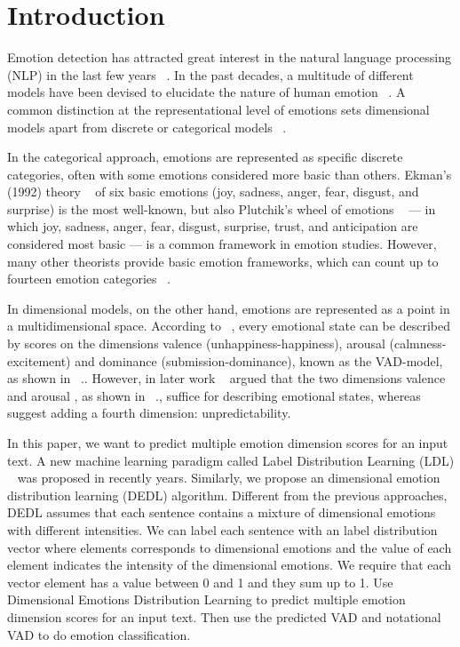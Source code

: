 \section{Introduction}\label{sec-intro}


Emotion detection has attracted great interest 
in the natural language processing (NLP)
in the last few years 
~\citep{DBLP:journals/corr/abs-1804-06137,DBLP:journals/corr/abs-1904-00132}.
In the past decades, 
a multitude of different
models have been devised to 
elucidate the nature of human emotion 
~\citep{Scherer2000}. 
A common distinction at the representational level 
of emotions sets dimensional models apart
from discrete or categorical models 
~\cite{Stevenson2007}.

In the categorical approach, 
emotions are represented as 
specific discrete categories,
often with some emotions considered 
more basic than others. 
Ekman’s (1992) theory 
~\cite{Ekman1992}
of six basic emotions 
(joy, sadness, anger, fear, disgust, and surprise) 
is the most well-known,
but also Plutchik’s wheel of emotions
~\cite{Plutchik1980}
 — in which joy, sadness, anger, fear, disgust,
surprise, trust, and anticipation 
are considered most basic — 
is a common framework
in emotion studies. 
However, 
many other theorists provide basic emotion frameworks,
which can count up to fourteen emotion categories 
~\cite{Izard1971,Roseman1984}.

In dimensional models, 
on the other hand, 
emotions are represented as a point in a
multidimensional space. 
According to 
~\cite{Mehrabian1974}, 
every emotional state can be
described by scores 
on the dimensions valence (unhappiness-happiness),
arousal (calmness-excitement) 
and dominance (submission-dominance), 
known as the VAD-model,
as shown in ~.. 
However, 
in later work 
~\cite{Russell1980}
argued that 
the two dimensions valence and arousal ,
as shown in ~.,
suffice for describing emotional states,
whereas 
~\cite{Fontaine2007}
suggest adding a fourth dimension: 
unpredictability.

In this paper, 
we want to predict  
multiple emotion dimension scores for an input text.
A new machine learning paradigm called 
Label Distribution Learning (LDL) 
~\cite{Geng2016}
was proposed in recently years.
Similarly,
we propose an dimensional emotion distribution learning (DEDL) algorithm.
Different from the previous approaches, 
DEDL assumes that
each sentence contains a mixture of 
dimensional emotions with different intensities. 
We can label each sentence with 
an label distribution vector 
where elements corresponds to 
dimensional emotions and 
the value of each element indicates the intensity of the dimensional emotions. 
We require that each vector element has a value 
between 0 and 1 and they sum up to 1.
Use Dimensional Emotions Distribution Learning
to predict multiple emotion dimension scores for an input text.
Then use the predicted VAD and notational VAD to 
do emotion classification.


